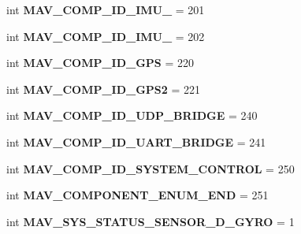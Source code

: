 \begin{DoxyCompactItemize}
int {\bfseries M\+A\+V\+\_\+\+C\+O\+M\+P\+\_\+\+I\+D\+\_\+\+I\+M\+U\+\_} = 201
\item 
\mbox{\label{namespacepymavlink_1_1dialects_1_1v10_ac615749095f4fad770172b1e32f7b0f8}} 
int {\bfseries M\+A\+V\+\_\+\+C\+O\+M\+P\+\_\+\+I\+D\+\_\+\+I\+M\+U\+\_} = 202
\item 
\mbox{\label{namespacepymavlink_1_1dialects_1_1v10_ab8d357e3ae4882ee940b4b8cc55fbc2f}} 
int {\bfseries M\+A\+V\+\_\+\+C\+O\+M\+P\+\_\+\+I\+D\+\_\+\+G\+PS} = 220
\item 
\mbox{\label{namespacepymavlink_1_1dialects_1_1v10_a0276e0893f5c23b9f4d8c68e5230306b}} 
int {\bfseries M\+A\+V\+\_\+\+C\+O\+M\+P\+\_\+\+I\+D\+\_\+\+G\+P\+S2} = 221
\item 
\mbox{\label{namespacepymavlink_1_1dialects_1_1v10_af538b724f843fbc988550505c3034852}} 
int {\bfseries M\+A\+V\+\_\+\+C\+O\+M\+P\+\_\+\+I\+D\+\_\+\+U\+D\+P\+\_\+\+B\+R\+I\+D\+GE} = 240
\item 
\mbox{\label{namespacepymavlink_1_1dialects_1_1v10_a421f36a23b2f53af646e3b0fa2438662}} 
int {\bfseries M\+A\+V\+\_\+\+C\+O\+M\+P\+\_\+\+I\+D\+\_\+\+U\+A\+R\+T\+\_\+\+B\+R\+I\+D\+GE} = 241
\item 
\mbox{\label{namespacepymavlink_1_1dialects_1_1v10_af64e5e172982d427fb66b03f94387f94}} 
int {\bfseries M\+A\+V\+\_\+\+C\+O\+M\+P\+\_\+\+I\+D\+\_\+\+S\+Y\+S\+T\+E\+M\+\_\+\+C\+O\+N\+T\+R\+OL} = 250
\item 
\mbox{\label{namespacepymavlink_1_1dialects_1_1v10_acccc5171437730b004e2bfccb32bce37}} 
int {\bfseries M\+A\+V\+\_\+\+C\+O\+M\+P\+O\+N\+E\+N\+T\+\_\+\+E\+N\+U\+M\+\_\+\+E\+ND} = 251
\item 
\mbox{\label{namespacepymavlink_1_1dialects_1_1v10_a674708fd87bcfeba017879d2412bd7ad}} 
int {\bfseries M\+A\+V\+\_\+\+S\+Y\+S\+\_\+\+S\+T\+A\+T\+U\+S\+\_\+\+S\+E\+N\+S\+O\+R\+\_\+D\+\_\+\+G\+Y\+RO} = 1
\item 

\end{DoxyCompactItemize}
